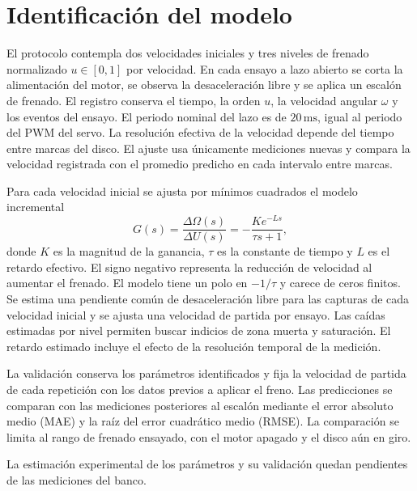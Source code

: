 \section{Identificaci\'on del modelo}

El protocolo contempla dos velocidades iniciales y tres niveles de
frenado normalizado $u\in[0,1]$ por velocidad. En cada ensayo a lazo
abierto se corta la alimentaci\'on del motor, se observa la
desaceleraci\'on libre y se aplica un escal\'on de frenado. El registro
conserva el tiempo, la orden $u$, la velocidad angular $\omega$ y
los eventos del ensayo. El periodo nominal del lazo es de
$20\,\mathrm{ms}$, igual al periodo del PWM del servo. La resoluci\'on
efectiva de la velocidad depende del tiempo entre marcas del disco.
El ajuste usa \'unicamente mediciones nuevas y compara la velocidad
registrada con el promedio predicho en cada intervalo entre marcas.

Para cada velocidad inicial se ajusta por m\'inimos cuadrados el modelo
incremental
\begin{equation}
  G(s)=\frac{\Delta\Omega(s)}{\Delta U(s)}
       =-\frac{K e^{-Ls}}{\tau s+1},
  \label{eq:planta-frenado}
\end{equation}
donde $K$ es la magnitud de la ganancia, $\tau$ es la constante de
tiempo y $L$ es el retardo efectivo. El signo negativo representa la
reducci\'on de velocidad al aumentar el frenado. El modelo tiene un
polo en $-1/\tau$ y carece de ceros finitos. Se estima una pendiente
com\'un de desaceleraci\'on libre para las capturas de cada velocidad
inicial y se ajusta una velocidad de partida por ensayo. Las ca\'idas
estimadas por nivel permiten buscar indicios de zona muerta y
saturaci\'on. El retardo estimado incluye el efecto de la resoluci\'on
temporal de la medici\'on.

La validaci\'on conserva los par\'ametros identificados y fija la
velocidad de partida de cada repetici\'on con los datos previos a
aplicar el freno. Las predicciones se comparan con las mediciones
posteriores al escal\'on mediante el error absoluto medio (MAE) y la
ra\'iz del error cuadr\'atico medio (RMSE). La comparaci\'on se limita
al rango de frenado ensayado, con el motor apagado y el disco a\'un
en giro.

La estimaci\'on experimental de los par\'ametros y su validaci\'on
quedan pendientes de las mediciones del banco.
